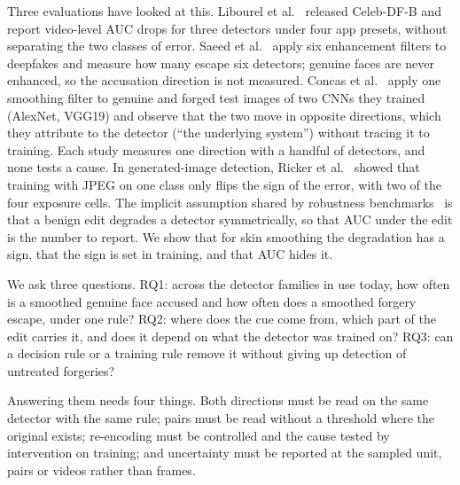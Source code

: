 \documentclass[conference]{IEEEtran}
\begin{document}
Three evaluations have looked at this. Libourel et al.~\cite{libourel2024} released Celeb-DF-B and report video-level AUC
drops for three detectors under four app presets, without separating the two classes of error. Saeed et al.~\cite{saeed2025}
apply six enhancement filters to deepfakes and measure how many escape six detectors; genuine faces are never enhanced, so
the accusation direction is not measured. Concas et al.~\cite{concas2025} apply one smoothing filter to genuine and forged
test images of two CNNs they trained (AlexNet, VGG19) and observe that the two move in opposite directions, which they attribute to the detector (``the underlying system'') without tracing it to training. Each study measures one direction with a handful of detectors, and none tests a cause. In generated-image detection, Ricker et
al.~\cite{ricker2026biasid} showed that training with JPEG on one class only flips the sign of the error, with two of the
four exposure cells. The implicit assumption shared by robustness benchmarks~\cite{deeperforensics2020,moire2025,hendrycks2019}
is that a benign edit degrades a detector symmetrically, so that AUC under the edit is the number to report. We show that for
skin smoothing the degradation has a sign, that the sign is set in training, and that AUC hides it.

We ask three questions. RQ1: across the detector families in use today, how often is a smoothed genuine face accused and
how often does a smoothed forgery escape, under one rule? RQ2: where does the cue come from, which part of the edit carries
it, and does it depend on what the detector was trained on? RQ3: can a decision rule or a training rule remove it without
giving up detection of untreated forgeries?

Answering them needs four things. Both directions must be read on the same detector with the same rule; pairs must be read without a threshold where the original exists; re-encoding must be controlled and the cause tested by intervention on training; and uncertainty must be reported at the sampled unit, pairs or videos rather than frames.
\end{document}
